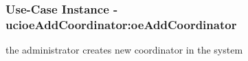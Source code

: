 \subsubsection{Use-Case Instance - ucioeAddCoordinator:oeAddCoordinator}

 the administrator creates new coordinator in the system		  
\begin{operationmodel}

\end{operationmodel} 

